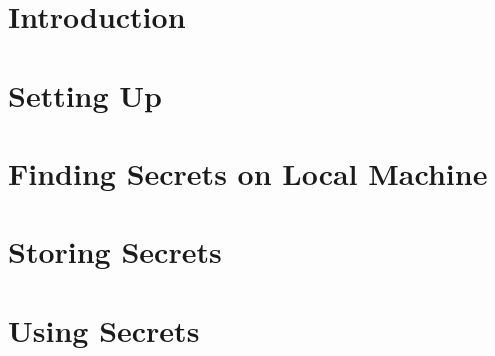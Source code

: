 \documentclass[11pt]{article}
\begin{document}
	\cleardoublepage
	
	\tableofcontents
	\thispagestyle{empty}
	\cleardoublepage
	\setcounter{page}{1}
	
	\section{Introduction}
	\lipsum[1]
	\section{Setting Up}
	\section{Finding Secrets on Local Machine}
	\section{Storing Secrets}
	\section{Using Secrets}
	
\end{document}
